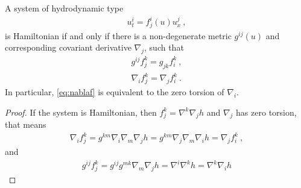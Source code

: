 \begin{theorem}
    
    A system of hydrodynamic type 
    \begin{align}
        u^i_t = f^i_j(u) u^j_x \:,
    \end{align}
    is Hamiltonian if and only if there is a non-degenerate metric $g^{ij}(u)$ and corresponding covariant derivative $\nabla_j$, such that
    \begin{align}
        g^{ij} f^k_j = g_{jk} f^k_i \:, \label{eq:gf=gf} \\
        \nabla_i f^k_j = \nabla_j f^k_i \label{eq:nablaf} \:.
    \end{align}
    In particular, \eqref{eq:nablaf} is equivalent to the zero torsion of $\nabla_i$.
\end{theorem}

\begin{proof}
    If the system is Hamiltonian, then $f^k_j = \nabla^k \nabla_j h$ and $\nabla_j$ has zero torsion, that means
    \begin{align}
        \nabla_i f^k_j = g^{km} \nabla_i \nabla_m \nabla_j h = g^{km} \nabla_j \nabla_m \nabla_i h = \nabla_j f^{k}_i \:,
    \end{align}
    and
    \begin{align}
        g^{ij} f^{k}_j = g^{ij} g^{mk} \nabla_m \nabla_j h = \nabla^i \nabla^k h = \nabla^k \nabla_i h
    \end{align}
\end{proof}
